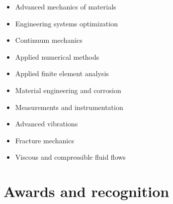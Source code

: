 \documentclass[10pt]{article} %
\begin{document}
\begin{paracol}{2} %

	\begin{itemize}\itemsep0em 
		\item Advanced mechanics of materials
		\item Engineering systems optimization
		\item Continuum mechanics
		\item Applied numerical methods
		\item Applied finite element analysis
	\end{itemize}
		
	
	\switchcolumn %
	

	\begin{itemize}\itemsep0em 
		\item Material engineering and corrosion
		\item Measurements and instrumentation
		\item Advanced vibrations
		\item Fracture mechanics	
		\item Viscous and compressible fluid flows
	\end{itemize}

	
\end{paracol}


\section{Awards and recognition}



\end{document}
